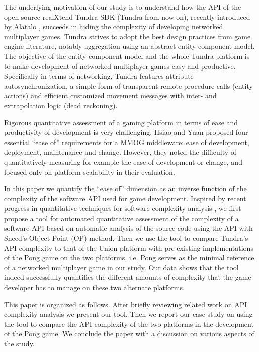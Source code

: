 \documentclass[conference]{IEEEtran}
\begin{document}
The underlying motivation of our study is to understand how the API of
the open source realXtend Tundra SDK (Tundra from now on), recently
introduced by Alatalo \cite{Alatalo2011}, succeeds in hiding the
complexity of developing networked multiplayer games. Tundra strives
to adopt the best design practices from game engine literature,
notably aggregation using an abstract entity-component model. The
objective of the entity-component model and the whole Tundra platform
is to make development of networked multiplayer games easy and
productive. Specifically in terms of networking, Tundra features
attribute autosynchronization, a simple form of transparent remote
procedure calls (entity actions) and efficient customized movement
messages with inter- and extrapolation logic (dead reckoning).

Rigorous quantitative assessment of a gaming platform in terms of ease
and productivity of development is very challenging. Hsiao and Yuan
\cite{middleware} proposed four essential ``ease of'' requirements for a MMOG
middleware: ease of development, deployment, maintenance and
change. However, they noted the difficulty of quantitatively measuring
for example the ease of development or change, and focused only on
platform scalability in their evaluation. 

In this paper we quantify the “ease of” dimension as an inverse
function of the complexity of the software API used for game
development. Inspired by recent progress in quantitative techniques
for software complexity analysis
\cite{cmu-api_failures,api-complexity-analysis}, we first propose a
tool for automated quantitative assessment of the complexity of a
software API based on automatic analysis of the source code using the
API with Sneed’s Object-Point (OP) method. Then we use the tool to
compare Tundra’s API complexity to that of the Union platform with
pre-existing implementations of the Pong game on the two platforms,
i.e. Pong serves as the minimal reference of a networked multiplayer
game in our study. Our data shows that the tool indeed successfully
quantifies the different amounts of complexity that the game developer
has to manage on these two alternate platforms.

This paper is organized as follows. After briefly reviewing related
work on API complexity analysis we present our tool. Then we report
our case study on using the tool to compare the API complexity of the
two platforms in the development of the Pong game. We conclude the
paper with a discussion on various aspects of the study.
\end{document}
